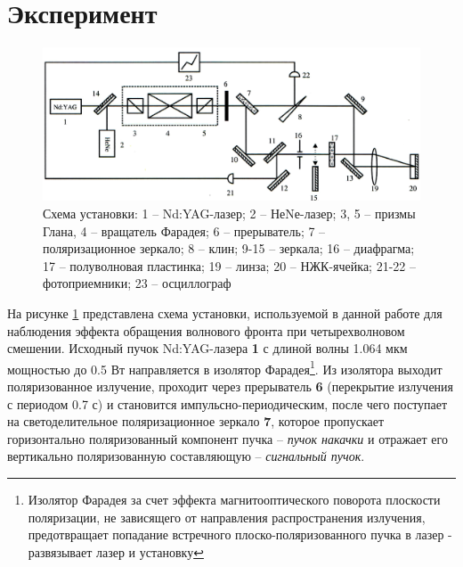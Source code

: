 \documentclass[a4paper,14pt]{extarticle}
\begin{document}
\section{Эксперимент}
\begin{figure}[h]
	\centering
	\includegraphics[width=\textwidth]{fig/scheme.png}
	\caption{Схема установки: 1 -- Nd:YAG-лазер; 2 -- НеNе-лазер; 3, 5 -- призмы Глана, 4 -- вращатель Фарадея; 6 -- прерыватель; 7 -- поляризационное зеркало; 8 -- клин; 9-15 -- зеркала; 16 -- диафрагма; 17 -- полуволновая пластинка; 19 -- линза; 20 -- НЖК-ячейка; 21-22 -- фотоприемники; 23 -- осциллограф}
	\label{fig:figure6}
\end{figure}
На рисунке \ref{fig:figure6} представлена схема установки, используемой в данной работе для наблюдения эффекта обращения волнового фронта при четырехволновом смешении. Исходный пучок Nd:YAG-лазера \textbf{1} с длиной волны 1.064 мкм мощностью до 0.5 Вт направляется в изолятор Фарадея\footnote{Изолятор Фарадея за счет эффекта магнитооптического поворота плоскости поляризации, не зависящего от направления распространения излучения, предотвращает попадание встречного плоско-поляризованного пучка в лазер - развязывает лазер и установку}. Из изолятора выходит поляризованное излучение, проходит через прерыватель \textbf{6} (перекрытие излучения с периодом 0.7 с) и становится импульсно-периодическим, после чего поступает на светоделительное поляризационное зеркало \textbf{7}, которое пропускает горизонтально поляризованный компонент пучка -- \textit{пучок накачки} и отражает его вертикально поляризованную составляющую -- \textit{сигнальный пучок}.
\end{document}
